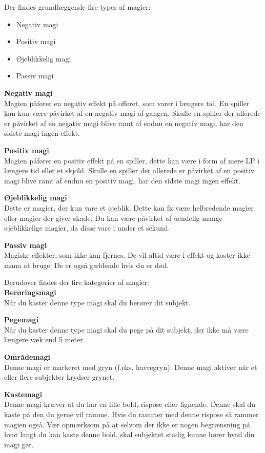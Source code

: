 Der findes grundlæggende fire typer af magier:
\begin{itemize}
    \item Negativ magi
    \item Positiv magi
    \item Øjeblikkelig magi
    \item Passiv magi
\end{itemize}

{\large\textbf{Negativ magi}}\\
Magien påfører en negativ effekt på offeret, som varer i længere tid. En spiller kan kun være påvirket af en negativ magi af gangen. Skulle en spiller der allerede er påvirket af en negativ magi blive ramt af endnu en negativ magi, har den sidste magi ingen effekt.

{\large\textbf{Positiv magi}}\\
Magien påfører en positiv effekt på en spiller, dette kan være i form af mere LP i længere tid eller et skjold. Skulle en spiller der allerede er påvirket af en positiv magi blive ramt af endnu en positiv magi, har den sidste magi ingen effekt.

{\large\textbf{Øjeblikkelig magi}}\\
Dette er magier, der kun vare et øjeblik. Dette kan fx være helbredende magier eller magier der giver skade. Du kan være påvirket af uendelig mange øjeblikkelige magier, da disse vare i under et sekund.

{\large\textbf{Passiv magi}}\\
Magiske effekter, som ikke kan fjernes. De vil altid være i effekt og koster ikke mana at bruge. De er også gældende hvis du er død.

Derudover findes der fire kategorier af magier:\\
{\large\textbf{Berøringsmagi}}\\
Når du kaster denne type magi skal du berører dit subjekt.

{\large\textbf{Pegemagi}}\\
Når du kaster denne type magi skal du pege på dit subjekt, der ikke må være længere væk end 5 meter.

{\large\textbf{Områdemagi}}\\
Denne magi er markeret med gryn (f.eks. havregryn). Denne magi aktiver når et eller flere subjekter krydser grynet.

{\large\textbf{Kastemagi}}\\
Denne magi kræver at du har en lille bold, rispose eller lignende. Denne skal du kaste på den du gerne vil ramme. Hvis du rammer med denne rispose så rammer magien også. Vær opmærksom på at selvom der ikke er nogen begrænsning på hvor langt du kan kaste denne bold, skal subjektet stadig kunne hører hvad din magi gør.


